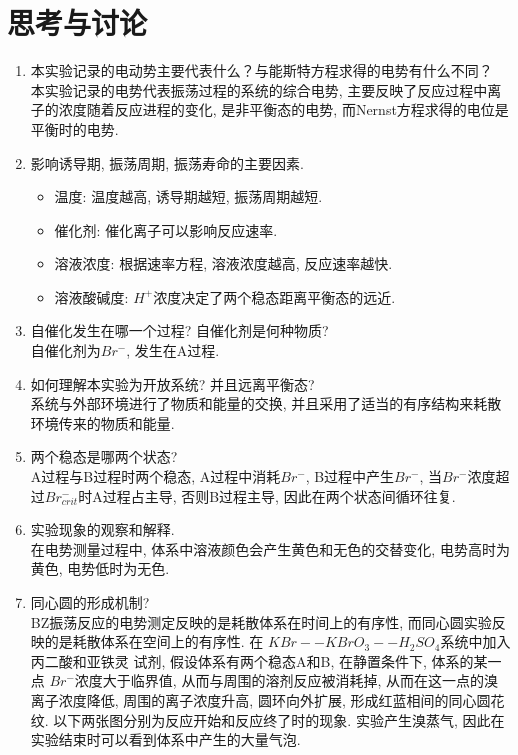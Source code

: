 \documentclass[a4paper]{article}
\begin{document}
\section{思考与讨论}
\begin{enumerate}
	\item 本实验记录的电动势主要代表什么？与能斯特方程求得的电势有什么不同？\\
	本实验记录的电势代表振荡过程的系统的综合电势,
	主要反映了反应过程中离子的浓度随着反应进程的变化, 
	是非平衡态的电势, 而Nernst方程求得的电位是平衡时的电势.
	\item 影响诱导期, 振荡周期, 振荡寿命的主要因素.
	\begin{itemize}
		\item 温度: 温度越高, 诱导期越短, 振荡周期越短.
		\item 催化剂: 催化离子可以影响反应速率.
		\item 溶液浓度: 根据速率方程, 溶液浓度越高, 反应速率越快.
		\item 溶液酸碱度: $H^{+}$浓度决定了两个稳态距离平衡态的远近. 
	\end{itemize}
	\item 自催化发生在哪一个过程? 自催化剂是何种物质?\\
	自催化剂为$Br^{-}$, 发生在A过程.
	\item 如何理解本实验为开放系统? 并且远离平衡态?\\
	系统与外部环境进行了物质和能量的交换, 
	并且采用了适当的有序结构来耗散环境传来的物质和能量.
	\item 两个稳态是哪两个状态?\\
	A过程与B过程时两个稳态, A过程中消耗$Br^{-}$, B过程中产生$Br^{-}$, 
	当$Br^{-}$浓度超过$Br^{-}_{crit}$时A过程占主导,
	否则B过程主导, 因此在两个状态间循环往复.
	\item 实验现象的观察和解释.\\
	在电势测量过程中, 体系中溶液颜色会产生黄色和无色的交替变化,
	电势高时为黄色, 电势低时为无色. 
	\item 同心圆的形成机制?\\
	BZ振荡反应的电势测定反映的是耗散体系在时间上的有序性,
	而同心圆实验反映的是耗散体系在空间上的有序性. 在
	$KBr -- KBrO_{3} -- H_{2}SO_{4}$系统中加入丙二酸和亚铁灵
	试剂, 假设体系有两个稳态A和B, 在静置条件下, 体系的某一点
	$Br^{-}$浓度大于临界值, 从而与周围的溶剂反应被消耗掉, 
	从而在这一点的溴离子浓度降低, 周围的离子浓度升高, 圆环向外扩展,
	形成红蓝相间的同心圆花纹. 以下两张图分别为反应开始和反应终了时的现象. 实验产生溴蒸气, 
	因此在实验结束时可以看到体系中产生的大量气泡.
	\begin{figure}[!h]

\end{figure}
\end{enumerate}
\end{document}
